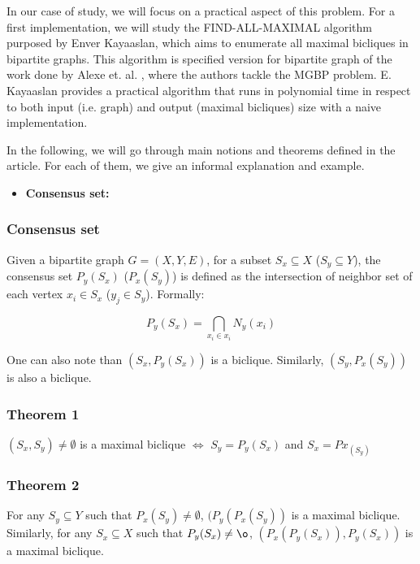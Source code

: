 \documentclass[table]{report}
\begin{document}
In our case of study, we will focus on a practical aspect of this problem. For a first implementation, we will study the FIND-ALL-MAXIMAL algorithm purposed by Enver Kayaaslan, which aims to enumerate all maximal bicliques in bipartite graphs. This algorithm is specified version for bipartite graph of the work done by Alexe et. al. \cite{alexe}, where the authors tackle the MGBP problem. E. Kayaaslan provides a practical algorithm that runs in polynomial time in respect to both input (i.e. graph) and output (maximal bicliques) size with a naive implementation.

In the following, we will go through main notions and theorems defined in the article. For each of them, we give an informal explanation and example.


\begin{itemize}[noitemsep]
    \item \textbf{Consensus set: }
    
\end{itemize}
    
    
    
\subsubsection{Consensus set}  

Given a bipartite graph $G = (X,Y,E)$, for a subset $S_x \subseteq X$ ($S_y \subseteq Y$), the consensus set $P_y(S_x)$ ($P_x(S_y)$) is defined as the intersection of neighbor set of each vertex $x_i \in S_x$ ($y_j \in S_y$).\cite{kayaaslan} Formally:

$$ P_y(S_x) = \bigcap\limits_{x_i \in x_i}N_y(x_i)$$ 

\noindent
One can also note than $(S_x,P_y(S_x))$ is a biclique. Similarly, $(S_y,P_x(S_y))$ is also a biclique. 

\subsubsection{Theorem 1}  

$(S_x,S_y) \neq \emptyset$ is a maximal biclique $\Leftrightarrow$ $S_y = P_y(S_x)$ and $S_x = Px_(S_y)$


\subsubsection{Theorem 2}  

For any $S_y \subseteq Y$ such that $P_x(S_y) \neq \emptyset$, $(P_y(P_x(S_y))$ is a maximal biclique. Similarly, for any $S_x \subseteq X$ such that $P_y(S_x) \neq \o$, $(P_x(P_y(S_x)), P_y(S_x))$ is a maximal biclique. 
\end{document}
